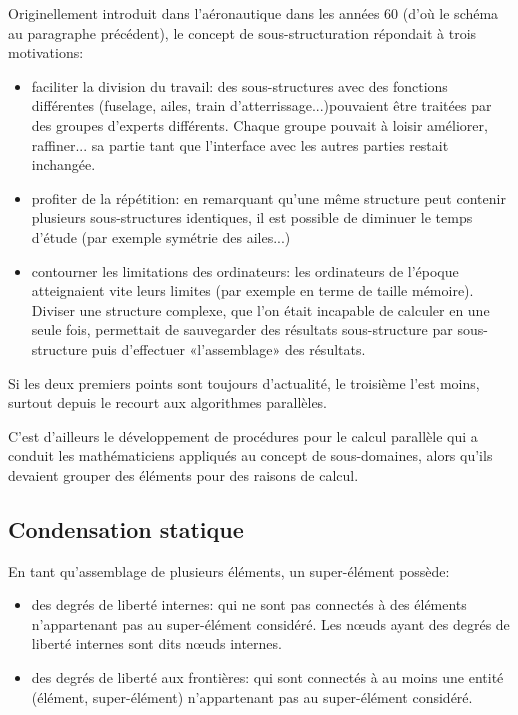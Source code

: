 \medskip
\begin{histoire}
Originellement introduit dans l'aéronautique dans les années 60 (d'où le schéma au paragraphe précédent), le concept de sous-structuration répondait à trois motivations:
\begin{itemize}
  \item faciliter la division du travail:
	des sous-structures avec des fonctions différentes (fuselage, ailes, train d'atterrissage...)pouvaient être traitées par des groupes d'experts différents. Chaque groupe pouvait à loisir améliorer, raffiner... sa partie tant que l'interface avec les autres parties restait inchangée.
  \item profiter de la répétition:
	en remarquant qu'une même structure peut contenir plusieurs sous-structures identiques, il est possible de diminuer le temps d'étude (par exemple symétrie des ailes...) 
  \item contourner les limitations des ordinateurs:
	les ordinateurs de l'époque atteignaient vite leurs limites (par exemple en terme de taille mémoire). Diviser une structure complexe, que l'on était incapable de calculer en une seule fois, permettait de sauvegarder des résultats sous-structure par sous-structure puis d'effectuer «l'assemblage» des résultats.
\end{itemize}
Si les deux premiers points sont toujours d'actualité, le troisième l'est moins, surtout depuis le recourt aux algorithmes parallèles.

C'est d'ailleurs le développement de procédures pour le calcul parallèle qui a conduit les mathématiciens appliqués au concept de sous-domaines, alors qu'ils devaient grouper des éléments pour des raisons de calcul.
\end{histoire}

\medskip
\subsection{Condensation statique}\label{Sec-condens}

En tant qu'assemblage de plusieurs éléments, un super-élément possède:
\begin{itemize}
  \item des degrés de liberté internes:
	qui ne sont pas connectés à des éléments n'appartenant pas au super-élément considéré.
	Les nœuds ayant des degrés de liberté internes sont dits nœuds internes.
  \item des degrés de liberté aux frontières:
	qui sont connectés à au moins une entité (élément, super-élément)
	n'appartenant pas au super-élément considéré.
\end{itemize}

